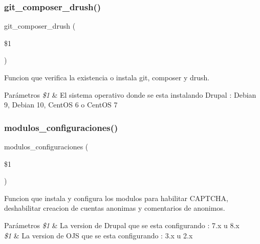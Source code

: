 \subsubsection{\texorpdfstring{git\+\_\+composer\+\_\+drush()}{git\_composer\_drush()}}
{\footnotesize\ttfamily git\+\_\+composer\+\_\+drush (\begin{DoxyParamCaption}\item[{}]{\$1 }\end{DoxyParamCaption})}



Funcion que verifica la existencia o instala git, composer y drush. 


\begin{DoxyParams}{Parámetros}
{\em \$1} & El sistema operativo donde se esta instalando Drupal \+: \textquotesingle{}Debian 9\textquotesingle{}, \textquotesingle{}Debian 10\textquotesingle{}, \textquotesingle{}Cent\+OS 6\textquotesingle{} o \textquotesingle{}Cent\+OS 7\textquotesingle{} \\
\hline
\end{DoxyParams}
\mbox{\label{Drupal__Instalador__General_8sh_ae5ce76ad68690ff00cb63811e18c8a37}} 
\subsubsection{\texorpdfstring{modulos\+\_\+configuraciones()}{modulos\_configuraciones()}}
{\footnotesize\ttfamily modulos\+\_\+configuraciones (\begin{DoxyParamCaption}\item[{}]{\$1 }\end{DoxyParamCaption})}



Funcion que instala y configura los modulos para habilitar C\+A\+P\+T\+C\+HA, deshabilitar creacion de cuentas anonimas y comentarios de anonimos. 


\begin{DoxyParams}{Parámetros}
{\em \$1} & La version de Drupal que se esta configurando \+: \textquotesingle{}7.\+x\textquotesingle{} u \textquotesingle{}8.\+x\textquotesingle{}\\
\hline
{\em \$1} & La version de O\+JS que se esta configurando \+: \textquotesingle{}3.\+x\textquotesingle{} u \textquotesingle{}2.\+x\textquotesingle{} \\
\hline
\end{DoxyParams}
